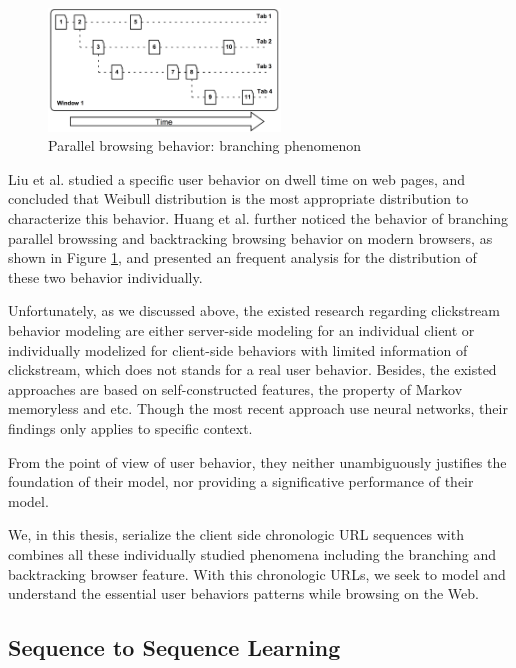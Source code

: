 \begin{figure}[H]
    \centering
    \includegraphics[width=0.55\textwidth]{figures/branching-and-backtracking}
    \caption{Parallel browsing behavior: branching phenomenon \cite{huang2010parallel}}
    \label{fig:backtrace}
\end{figure}

Liu et al. \cite{liu2010understanding} studied a specific user behavior on dwell time on web pages, and concluded that
Weibull distribution is the most appropriate distribution to characterize this behavior. 
Huang et al. \cite{huang2010parallel, huang2012no} further 
noticed the behavior of branching parallel browssing and backtracking browsing
behavior on modern browsers, as shown in Figure \ref{fig:backtrace}, 
and presented an frequent analysis for the distribution of these two behavior individually.

Unfortunately, as we discussed above, the existed research regarding clickstream 
behavior modeling are either server-side modeling for an individual client or 
individually modelized for client-side behaviors with limited information of clickstream,
which does not stands for a real user behavior. 
Besides, the existed approaches are based on self-constructed features, 
the property of Markov memoryless and etc. Though the most recent
approach use neural networks, their findings only applies to specific context.

From the point of view of user behavior, they 
neither unambiguously justifies the foundation of their model, 
nor providing a significative performance of their model.

We, in this thesis, serialize the client side chronologic URL sequences with combines all 
these individually studied phenomena including the branching and backtracking browser 
feature. With this chronologic URLs, we seek to model and understand the essential user 
behaviors patterns while browsing on the Web.


\subsection{Sequence to Sequence Learning}
\label{sec:seq-learn}

